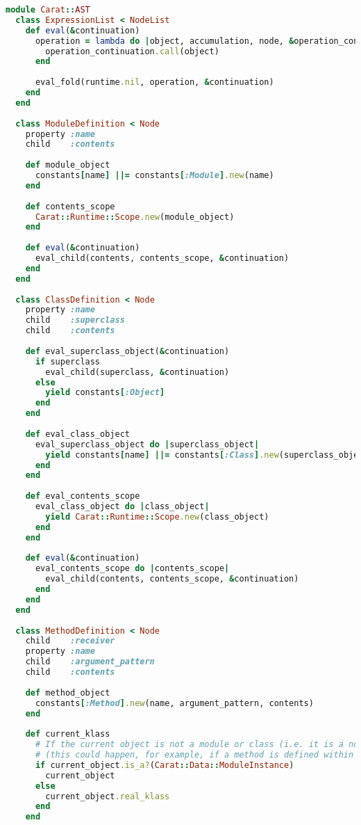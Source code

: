\begin{lstlisting}[title={\small\Helvetica ast/scopes.rb},language=Ruby]
module Carat::AST
  class ExpressionList < NodeList
    def eval(&continuation)
      operation = lambda do |object, accumulation, node, &operation_continuation|
        operation_continuation.call(object)
      end
      
      eval_fold(runtime.nil, operation, &continuation)
    end
  end
  
  class ModuleDefinition < Node
    property :name
    child    :contents
    
    def module_object
      constants[name] ||= constants[:Module].new(name)
    end
    
    def contents_scope
      Carat::Runtime::Scope.new(module_object)
    end
    
    def eval(&continuation)
      eval_child(contents, contents_scope, &continuation)
    end
  end
  
  class ClassDefinition < Node
    property :name
    child    :superclass
    child    :contents
    
    def eval_superclass_object(&continuation)
      if superclass
        eval_child(superclass, &continuation)
      else
        yield constants[:Object]
      end
    end
    
    def eval_class_object
      eval_superclass_object do |superclass_object|
        yield constants[name] ||= constants[:Class].new(superclass_object, name)
      end
    end
    
    def eval_contents_scope
      eval_class_object do |class_object|
        yield Carat::Runtime::Scope.new(class_object)
      end
    end
    
    def eval(&continuation)
      eval_contents_scope do |contents_scope|
        eval_child(contents, contents_scope, &continuation)
      end
    end
  end
  
  class MethodDefinition < Node
    child    :receiver
    property :name
    child    :argument_pattern
    child    :contents
    
    def method_object
      constants[:Method].new(name, argument_pattern, contents)
    end
    
    def current_klass
      # If the current object is not a module or class (i.e. it is a normal object), get its class
      # (this could happen, for example, if a method is defined within another method)
      if current_object.is_a?(Carat::Data::ModuleInstance)
        current_object
      else
        current_object.real_klass
      end
    end
    

\end{lstlisting}
